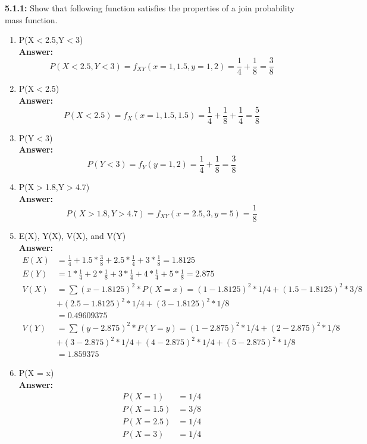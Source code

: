 \documentclass[11pt]{article}
\begin{document}
\noindent\textbf{5.1.1:} Show that following function satisfies the properties of a join probability mass function.
\begin{enumerate}
\item P(X$<$2.5,Y$<$3)
\\\textbf{Answer: }
\begin{equation}
P(X<2.5, Y < 3) = f_{XY}(x= 1, 1.5, y = 1, 2) = \frac{1}{4} + \frac{1}{8} = \frac{3}{8}
\end{equation}
\item P(X$<$2.5)
\\\textbf{Answer: }
\begin{equation}
P(X<2.5) = f_{X}(x= 1, 1.5, 1.5) = \frac{1}{4} + \frac{1}{8} +\frac{1}{4}= \frac{5}{8}
\end{equation}
\item P(Y$<$3)
\\\textbf{Answer: }
\begin{equation}
P(Y<3) = f_{Y}(y= 1,2) = \frac{1}{4} + \frac{1}{8} = \frac{3}{8}
\end{equation}
\item P(X$>$1.8,Y$>$4.7)
\\\textbf{Answer: }
\begin{equation}
P(X>1.8, Y > 4.7) = f_{XY}(x= 2.5, 3, y = 5) = \frac{1}{8}
\end{equation}
\item E(X), Y(X), V(X), and V(Y)
\\\textbf{Answer: }
\begin{equation}
\begin{split}
E(X) &= \frac{1}{4} + 1.5*\frac{3}{8} + 2.5*\frac{1}{4} + 3 * \frac{1}{8} = 1.8125\\
E(Y) &= 1*\frac{1}{4} + 2*\frac{1}{8} + 3*\frac{1}{4} + 4*\frac{1}{4}+5 * \frac{1}{8} = 2.875\\
V(X) &= \sum(x - 1.8125)^2*P(X = x) =(1 - 1.8125)^2 * 1/4 + (1.5 - 1.8125)^2 * 3/8\\
&+ (2.5 - 1.8125)^2 * 1/4+ (3 - 1.8125)^2 * 1/8\\
&= 0.49609375\\
V(Y) &= \sum(y-2.875)^2*P(Y=y) = (1 - 2.875)^2 * 1/4 + (2 - 2.875)^2 * 1/8\\
&+ (3 - 2.875)^2 * 1/4+ (4 - 2.875)^2 * 1/4+ (5 - 2.875)^2 * 1/8\\
&=1.859375
\end{split}
\end{equation}

\item P(X = x)
\\\textbf{Answer: }
\begin{equation}
\begin{split}
P(X = 1) & = 1/4\\
P(X = 1.5) &= 3/8\\
P(X =2.5) &= 1/4\\
P(X = 3) &= 1/4
\end{split}
\end{equation}

\end{enumerate}
\end{document}
